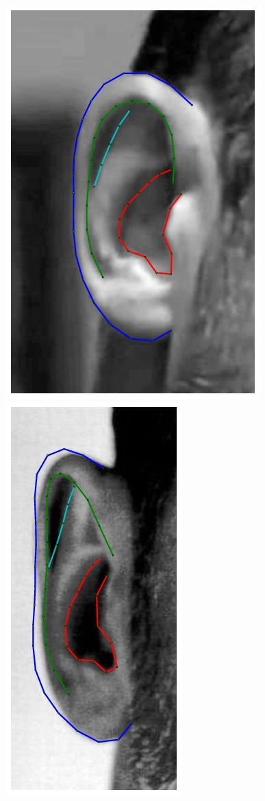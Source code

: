 \begin{figure}
    \hfill
    \includegraphics[height=\flowh]{resources/Ear_Deformable_Model/fittings/final_0003}
    \hfill
    \includegraphics[height=\flowh]{resources/Ear_Deformable_Model/fittings/final_0004}

\end{figure}
